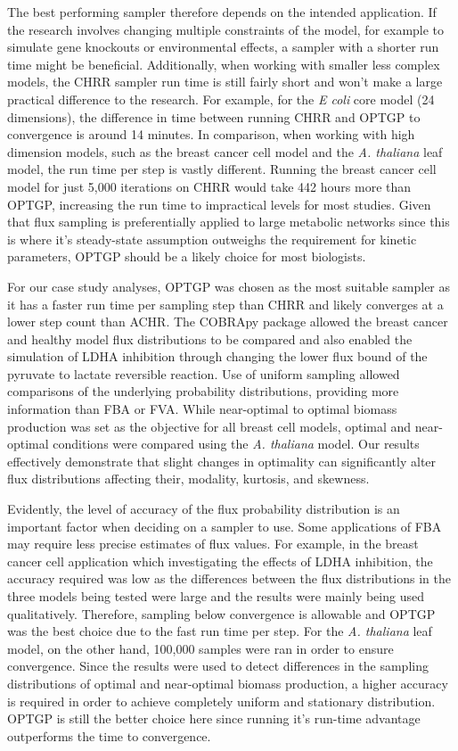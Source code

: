 \documentclass[10pt,letterpaper]{article}
\begin{document}
The best performing sampler therefore depends on the intended application. If the research involves changing multiple constraints of the model, for example to simulate gene knockouts or environmental effects, a sampler with a shorter run time might be beneficial. Additionally, when working with smaller less complex models, the CHRR sampler run time is still fairly short and won’t make a large practical difference to the research. For example, for the \textit{E coli} core model (24 dimensions), the difference in time between running CHRR and OPTGP to convergence is around 14 minutes. In comparison, when working with high dimension models, such as the breast cancer cell model and the \textit{A. thaliana} leaf model, the run time per step is vastly different. Running the breast cancer cell model for just 5,000 iterations on CHRR would take 442 hours more than OPTGP, increasing the run time to impractical levels for most studies. Given that flux sampling is preferentially applied to large metabolic networks since this is where it's steady-state assumption outweighs the requirement for kinetic parameters, OPTGP should be a likely choice for most biologists. 

For our case study analyses, OPTGP was chosen as the most suitable sampler as it has a faster run time per sampling step than CHRR and likely converges at a lower step count than ACHR. The COBRApy package allowed the breast cancer and healthy model flux distributions to be compared and also enabled the simulation of LDHA inhibition through changing the lower flux bound of the pyruvate to lactate reversible reaction. Use of uniform sampling allowed comparisons of the underlying probability distributions, providing more information than FBA or FVA. While near-optimal to optimal biomass production was set as the objective for all breast cell models, optimal and near-optimal conditions were compared using the \textit{A. thaliana} model. Our results effectively demonstrate that slight changes in optimality can significantly alter flux distributions affecting their, modality, kurtosis, and skewness. 

Evidently, the level of accuracy of the flux probability distribution is an important factor when deciding on a sampler to use. Some applications of FBA may require less precise estimates of flux values. For example, in the breast cancer cell application which investigating the effects of LDHA inhibition, the accuracy required was low as the differences between the flux distributions in the three models being tested were large and the results were mainly being used qualitatively. Therefore, sampling below convergence is allowable and OPTGP was the best choice due to the fast run time per step. For the \textit{A. thaliana} leaf model, on the other hand, 100,000 samples were ran in order to ensure convergence. Since the results were used to detect differences in the sampling distributions of optimal and near-optimal biomass production, a higher accuracy is required in order to achieve completely uniform and stationary distribution. OPTGP is still the better choice here since running it's run-time advantage outperforms the time to convergence. 
\end{document}
